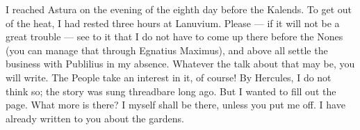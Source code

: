 

 I reached Astura on the evening of the eighth day before the Kalends. To get out of the heat, I had rested three hours at Lanuvium. Please --- if it will not be a great trouble --- see to it that I do not have to come up there before the Nones (you can manage that through Egnatius Maximus), and above all settle the business with Publilius in my absence. Whatever the talk about that may be, you will write. The People take an interest in it, of course! By Hercules, I do not think so; the story was sung threadbare long ago. But I wanted to fill out the page. What more is there? I myself shall be there, unless you put me off. I have already written to you about the gardens.
